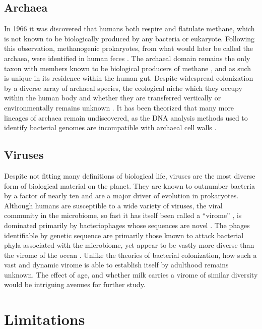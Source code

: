 \documentclass{../../../coursework}
\begin{document}
\subsection{Archaea}

In 1966 it was discovered that humans both respire and flatulate methane,
which is not known to be biologically produced by any bacteria or eukaryote.
Following this observation, methanogenic prokaryotes, from what would later
be called the archaea, were identified in human feces \parencite{Not68}. The
archaeal domain remains the only taxon with members known to be biological
producers of methane \parencite{Tha06}, and as such is unique in its
residence within the human gut. Despite widespread colonization by a diverse
array of archaeal species, the ecological niche which they occupy within the
human body and whether they are transferred vertically or environmentally
remains unknown \parencite{Dri11}. It has been theorized that many more
lineages of archaea remain undiscovered, as the DNA analysis methods used to
identify bacterial genomes are incompatible with archaeal cell walls
\parencite{Hor15}.

\subsection{Viruses}

Despite not fitting many definitions of biological life, viruses are the most
diverse form of biological material on the planet. They are known to
outnumber bacteria by a factor of nearly ten \parencite{Ore97} and are a
major driver of evolution in prokaryotes. Although humans are susceptible to
a wide variety of viruses, the viral community in the microbiome, so fast it
has itself been called a ``virome'' \parencite{Wyl12}, is dominated primarily
by bacteriophages whose sequences are novel \parencite{Dut14}. The phages
identifiable by genetic sequence are primarily those known to attack
bacterial phyla associated with the microbiome, yet appear to be vastly more
diverse than the virome of the ocean \parencite{Wal14}. Unlike the theories
of bacterial colonization, how such a vast and dynamic virome is able to
establish itself by adulthood remains unknown. The effect of age, and whether
milk carries a virome of similar diversity would be intriguing avenues for
further study.

\section{Limitations}
\end{document}
